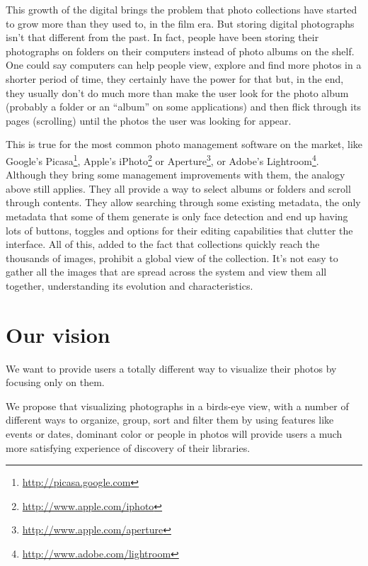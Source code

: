 This growth of the digital brings the problem that photo collections have started to grow more than they used to, in the film era. But storing digital photographs isn't that different from the past. In fact, people have been storing their photographs on folders on their computers instead of photo albums on the shelf. One could say computers can help people view, explore and find more photos in a shorter period of time, they certainly have the power for that but, in the end, they usually don't do much more than make the user look for the photo album (probably a folder or an ``album'' on some applications) and then flick through its pages (scrolling) until the photos the user was looking for appear.

This is true for the most common photo management software on the market, like Google's Picasa\footnote{\url{http://picasa.google.com}}, Apple's iPhoto\footnote{\url{http://www.apple.com/iphoto}} or Aperture\footnote{\url{http://www.apple.com/aperture}}, or Adobe's Lightroom\footnote{\url{http://www.adobe.com/lightroom}}. Although they bring some management improvements with them, the analogy above still applies. They all provide a way to select albums or folders and scroll through contents. They allow searching through some existing metadata, the only metadata that some of them generate is only face detection and end up having lots of buttons, toggles and options for their editing capabilities that clutter the interface. All of this, added to the fact that collections quickly reach the thousands of images, prohibit a global view of the collection. It's not easy to gather all the images that are spread across the system and view them all together, understanding its evolution and characteristics.

\section{Our vision} %
\label{ssub:our_vision}


We want to provide users a totally different way to visualize their photos by focusing only on them.

We propose that visualizing photographs in a birds-eye view, with a number of different ways to organize, group, sort and filter them by using features like events or dates, dominant color or people in photos will provide users a much more satisfying experience of discovery of their libraries.

